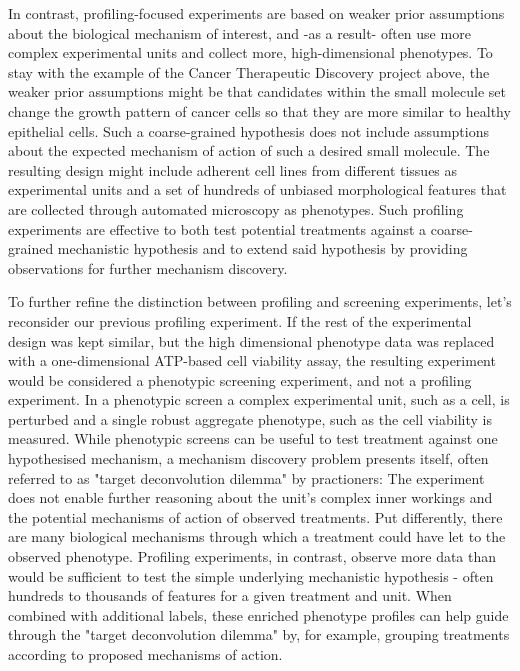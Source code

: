 \begin{flushleft}
In contrast, profiling-focused experiments are based on weaker prior assumptions about the biological mechanism of interest, and -as a result- often use more complex experimental units and collect more, high-dimensional phenotypes. To stay with the example of the Cancer Therapeutic Discovery project above, the weaker prior assumptions might be that candidates within the small molecule set change the growth pattern of cancer cells so that they are more similar to healthy epithelial cells. Such a coarse-grained hypothesis does not include assumptions about the expected mechanism of action of such a desired small molecule. The resulting design might include adherent cell lines from different tissues as experimental units and a set of hundreds of unbiased morphological features that are collected through automated microscopy as phenotypes. Such profiling experiments are effective to both test potential treatments against a coarse-grained mechanistic hypothesis and to extend said hypothesis by providing observations for further mechanism discovery. 

To further refine the distinction between profiling and screening experiments, let's reconsider our previous profiling experiment. If the rest of the experimental design was kept similar, but the high dimensional phenotype data was replaced with a one-dimensional ATP-based cell viability assay, the resulting experiment would be considered a phenotypic screening experiment, and not a profiling experiment. In a phenotypic screen a complex experimental unit, such as a cell, is perturbed and a single robust aggregate phenotype, such as the cell viability is measured. While phenotypic screens can be useful to test treatment against one hypothesised mechanism, a mechanism discovery problem presents itself, often referred to as "target deconvolution dilemma" by practioners: The experiment does not enable further reasoning about the unit's complex inner workings and the potential mechanisms of action of observed treatments. Put differently, there are many biological mechanisms through which a treatment could have let to the observed phenotype. Profiling experiments, in contrast, observe more data than would be sufficient to test the simple underlying mechanistic hypothesis - often hundreds to thousands of features for a given treatment and unit. When combined with additional labels, these enriched phenotype profiles can help guide through the "target deconvolution dilemma" by, for example, grouping treatments according to proposed mechanisms of action.


\end{flushleft}
